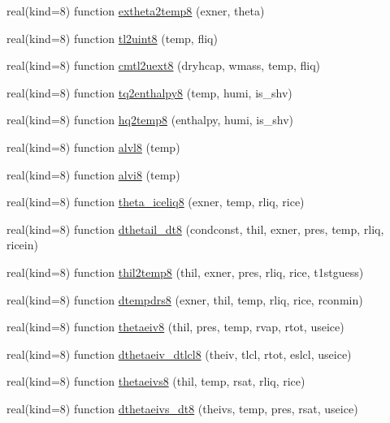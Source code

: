 \begin{DoxyCompactItemize}
real(kind=8) function \hyperlink{namespacetherm__lib8_ac210423ab55881e57a525b8f13593fa3}{extheta2temp8} (exner, theta)
\item 
real(kind=8) function \hyperlink{namespacetherm__lib8_afb21e6b55b53bbc124c228e01ccc60cb}{tl2uint8} (temp, fliq)
\item 
real(kind=8) function \hyperlink{namespacetherm__lib8_af5c7259346e1ee029458410d49100d77}{cmtl2uext8} (dryhcap, wmass, temp, fliq)
\item 
real(kind=8) function \hyperlink{namespacetherm__lib8_abc11d3a9518a513fd0b3b97e6fc0e68e}{tq2enthalpy8} (temp, humi, is\+\_\+shv)
\item 
real(kind=8) function \hyperlink{namespacetherm__lib8_a1ffd2b0e4437b77b168fa1df97e641ca}{hq2temp8} (enthalpy, humi, is\+\_\+shv)
\item 
real(kind=8) function \hyperlink{namespacetherm__lib8_a8dfe9d6c06c19f28e388354ce1001ec2}{alvl8} (temp)
\item 
real(kind=8) function \hyperlink{namespacetherm__lib8_a3b1992f0fffee3a316b79819cac27382}{alvi8} (temp)
\item 
real(kind=8) function \hyperlink{namespacetherm__lib8_a7d5573528d5f5adeb9beb594eead7f4f}{theta\+\_\+iceliq8} (exner, temp, rliq, rice)
\item 
real(kind=8) function \hyperlink{namespacetherm__lib8_a88d5c007e6cd1a34788af6ac891d6c01}{dthetail\+\_\+dt8} (condconst, thil, exner, pres, temp, rliq, ricein)
\item 
real(kind=8) function \hyperlink{namespacetherm__lib8_a7d009d0d3507e656b58c9eb70c747598}{thil2temp8} (thil, exner, pres, rliq, rice, t1stguess)
\item 
real(kind=8) function \hyperlink{namespacetherm__lib8_af3b110a715728849ed26074d4675f0e8}{dtempdrs8} (exner, thil, temp, rliq, rice, rconmin)
\item 
real(kind=8) function \hyperlink{namespacetherm__lib8_aca0eeff24415eab272c13efcba42ebd5}{thetaeiv8} (thil, pres, temp, rvap, rtot, useice)
\item 
real(kind=8) function \hyperlink{namespacetherm__lib8_ac2831ca558c25b3522c21e3cab5ce230}{dthetaeiv\+\_\+dtlcl8} (theiv, tlcl, rtot, eslcl, useice)
\item 
real(kind=8) function \hyperlink{namespacetherm__lib8_a43786e4d4bcf61f6d8fb66fa5a925df9}{thetaeivs8} (thil, temp, rsat, rliq, rice)
\item 
real(kind=8) function \hyperlink{namespacetherm__lib8_a6f2144435a34b9e51e60dcab30877216}{dthetaeivs\+\_\+dt8} (theivs, temp, pres, rsat, useice)

\end{DoxyCompactItemize}
